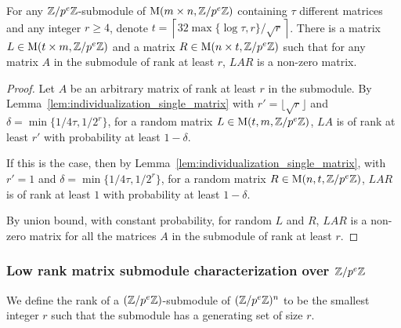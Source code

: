 \begin{lemma}\label{lem:individualization}
For any $\mathbb{Z}/p^e \mathbb{Z}$-submodule of $\mathrm{M}(m\times n, \mathbb{Z} / p^e \mathbb{Z})$ containing $\tau$ different matrices and any integer $r \geq 4$, 
denote 
$t = \left\lceil 32 \max\{\log \tau, r \}/ \sqrt{r} \right\rceil$. 
There is a matrix $L \in \mathrm{M}(t\times m, \mathbb{Z} / p^e \mathbb{Z})$ and a matrix $R \in \mathrm{M}(n\times t, \mathbb{Z} / p^e \mathbb{Z})$ such that for any matrix $A$ in the submodule of rank at least $r$, $LAR$ is a non-zero matrix. 
\end{lemma}
\begin{proof}
Let $A$ be an arbitrary matrix of rank at least $r$ in the submodule. By Lemma~\ref{lem:individualization_single_matrix} with $r' = \lfloor \sqrt{r}\rfloor$ and $\delta = \min\{1 / 4\tau, 1 / 2^r \}$, for a random matrix $L \in \mathrm{M}(t, m, \mathbb{Z}/p^e \mathbb{Z})$, $LA$ is of rank at least $r'$ with probability at least $1 - \delta$. 

If this is the case, then by Lemma~\ref{lem:individualization_single_matrix}, with $r' = 1$ and $\delta = \min\{1 / 4\tau, 1 / 2^r \}$, for a random matrix $R \in \mathrm{M}(n, t, \mathbb{Z}/p^e \mathbb{Z})$, $LAR$ is of rank at least $1$ with probability at least $1 - \delta$. 


By union bound, with constant probability, for random $L$ and $R$, $LAR$ is a non-zero matrix
for all the matrices $A$ in the submodule of rank at least $r$.
\end{proof}



\subsubsection{Low rank matrix submodule characterization over $\mathbb{Z}/p^e \mathbb{Z}$}


We define the rank of a $(\mathbb{Z} / p^e \mathbb{Z})$-submodule of $(\mathbb{Z} / p^e \mathbb{Z})^n$ to be the smallest integer $r$ such that 
the submodule has a generating set of size  $r$. %

